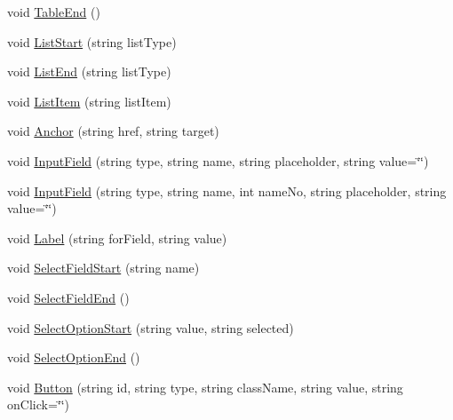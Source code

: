 \begin{DoxyCompactItemize}
\item 
void \hyperlink{classPageStructureMaker_a7f8fefbe7a825c1b7761fc8a0f1bb8e4}{Table\-End} ()
\item 
void \hyperlink{classPageStructureMaker_ac24ce26202757aaa30402155daf8a3d0}{List\-Start} (string list\-Type)
\item 
void \hyperlink{classPageStructureMaker_a8578b1555ad2fc92a9efc7dbf7d1fe87}{List\-End} (string list\-Type)
\item 
void \hyperlink{classPageStructureMaker_adf4116e526026edc3c8a3bcf96a7e929}{List\-Item} (string list\-Item)
\item 
void \hyperlink{classPageStructureMaker_a8c0fae5b599182863066de56ae0cea42}{Anchor} (string href, string target)
\item 
void \hyperlink{classPageStructureMaker_aec87050d1230402d695290fe78c86f03}{Input\-Field} (string type, string name, string placeholder, string value=\char`\"{}\char`\"{})
\item 
void \hyperlink{classPageStructureMaker_af528f8da142cbc47585c4dfeded873ba}{Input\-Field} (string type, string name, int name\-No, string placeholder, string value=\char`\"{}\char`\"{})
\item 
void \hyperlink{classPageStructureMaker_ae85f66489db9a65682bb9a2c2128f433}{Label} (string for\-Field, string value)
\item 
void \hyperlink{classPageStructureMaker_ae8684bb66ca463e2f92e09c96137f9e3}{Select\-Field\-Start} (string name)
\item 
void \hyperlink{classPageStructureMaker_a81eb3cdbc840a4c8165cef87330ade09}{Select\-Field\-End} ()
\item 
void \hyperlink{classPageStructureMaker_a77856078e74dab25329132ea07466f92}{Select\-Option\-Start} (string value, string selected)
\item 
void \hyperlink{classPageStructureMaker_a7682f479f7f1012d426ec9f9535def60}{Select\-Option\-End} ()
\item 
void \hyperlink{classPageStructureMaker_a53c013b1d6251be853be8f6c413e3455}{Button} (string id, string type, string class\-Name, string value, string on\-Click=\char`\"{}\char`\"{})
\end{DoxyCompactItemize}
